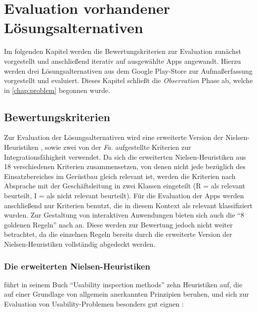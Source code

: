 \chapter{Evaluation vorhandener Lösungsalternativen}\label{chap:eval}
Im folgenden Kapitel werden die Bewertungskriterien zur Evaluation zunächst vorgestellt und anschließend iterativ auf ausgewählte Apps angewandt.
Hierzu werden drei Lösungsalternativen aus dem Google Play-Store zur Aufmaßerfassung vorgestellt und evaluiert.
Dieses Kapitel schließt die \emph{Observation} Phase ab, welche in \autoref{chap:problem} begonnen wurde. 

\section{Bewertungskriterien}\label{sec:criteria}
Zur Evaluation der Lösungsalternativen wird eine erweiterte Version der Nielsen-Heuristiken \citep{Nielsen94}, sowie zwei von der \emph{Fa.} \vr{} aufgestellte Kriterien zur Integrationsfähigkeit verwendet.
Da sich die erweiterten Nielsen-Heuristiken aus 18 verschiedenen Kriterien zusammensetzen, von denen nicht jede bezüglich des Einsatzbereiches im Gerüstbau gleich relevant ist, werden die Kriterien nach Absprache mit der Geschäftsleitung in zwei Klassen eingeteilt (R = als relevant beurteilt, I = als nicht relevant beurteilt).
Für die Evaluation der Apps werden anschließend nur Kriterien benutzt, die in diesem Kontext als relevant klassifiziert wurden.
Zur Gestaltung von interaktiven Anwendungen bieten sich auch die ``8 goldenen Regeln'' nach \citet{Shneiderman04} an.
Diese werden zur Bewertung jedoch nicht weiter betrachtet, da die einzelnen Regeln bereits durch die erweiterte Version der Nielsen-Heuristiken vollständig abgedeckt werden.

\subsection{Die erweiterten Nielsen-Heuristiken}\label{subsec:nielsen}
\citeauthor{Nielsen94} führt in seinem Buch ``Usability inspection methods'' zehn Heuristiken auf, die auf einer Grundlage von allgemein anerkannten Prinzipien beruhen, und sich zur Evaluation von Usability-Problemen besonders gut eignen \citep[Seite 25--62]{Nielsen94}: 


